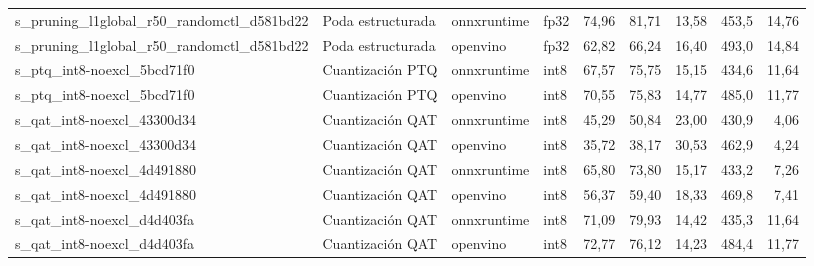 \begin{landscape}
\begin{table}[htbp]
\begin{adjustbox}{max width=\linewidth, max totalheight=\dimexpr\textheight-\ht\tfmedgetitle-\dp\tfmedgetitle-\ht\tfmedgenotes-\dp\tfmedgenotes-6pt\relax}
\begin{tabular}{llllrrrrr}
    s\_pruning\_l1global\_r50\_randomctl\_d581bd22 & Poda estructurada & onnxruntime & fp32 & 74,96 & 81,71 & 13,58 & 453,5 & 14,76 \\
    s\_pruning\_l1global\_r50\_randomctl\_d581bd22 & Poda estructurada & openvino & fp32 & 62,82 & 66,24 & 16,40 & 493,0 & 14,84 \\
    s\_ptq\_int8-noexcl\_5bcd71f0 & Cuantización PTQ & onnxruntime & int8 & 67,57 & 75,75 & 15,15 & 434,6 & 11,64 \\
    s\_ptq\_int8-noexcl\_5bcd71f0 & Cuantización PTQ & openvino & int8 & 70,55 & 75,83 & 14,77 & 485,0 & 11,77 \\
    s\_qat\_int8-noexcl\_43300d34 & Cuantización QAT & onnxruntime & int8 & 45,29 & 50,84 & 23,00 & 430,9 & 4,06 \\
    s\_qat\_int8-noexcl\_43300d34 & Cuantización QAT & openvino & int8 & 35,72 & 38,17 & 30,53 & 462,9 & 4,24 \\
    s\_qat\_int8-noexcl\_4d491880 & Cuantización QAT & onnxruntime & int8 & 65,80 & 73,80 & 15,17 & 433,2 & 7,26 \\
    s\_qat\_int8-noexcl\_4d491880 & Cuantización QAT & openvino & int8 & 56,37 & 59,40 & 18,33 & 469,8 & 7,41 \\
    s\_qat\_int8-noexcl\_d4d403fa & Cuantización QAT & onnxruntime & int8 & 71,09 & 79,93 & 14,42 & 435,3 & 11,64 \\
    s\_qat\_int8-noexcl\_d4d403fa & Cuantización QAT & openvino & int8 & 72,77 & 76,12 & 14,23 & 484,4 & 11,77 \\
    \bottomrule
  \end{tabular}
  \end{adjustbox}
  \par\vspace{2pt}
  \usebox{\tfmedgenotes}
\end{table}
\end{landscape}
